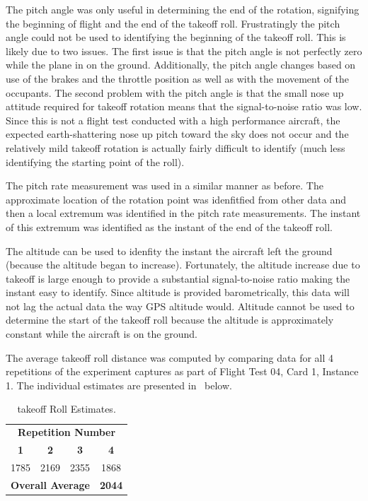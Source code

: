 \documentclass[conf]{new-aiaa}
\begin{document}
The pitch angle was only useful in determining the end of the rotation, signifying the beginning of flight and the end of the takeoff roll. Frustratingly the pitch angle could not be used to identifying the beginning of the takeoff roll. This is likely due to two issues. The first issue is that the pitch angle is not perfectly zero while the plane in on the ground. Additionally, the pitch angle changes based on use of the brakes and the throttle position as well as with the movement of the occupants. The second problem with the pitch angle is that the small nose up attitude required for takeoff rotation means that the signal-to-noise ratio was low. Since this is not a flight test conducted with a high performance aircraft, the expected earth-shattering nose up pitch toward the sky does not occur and the relatively mild takeoff rotation is actually fairly difficult to identify (much less identifying the starting point of the roll).

The pitch rate measurement was used in a similar manner as before. The approximate location of the rotation point was idenfitfied from other data and then a local extremum was identified in the pitch rate measurements. The instant of this extremum was identified as the instant of the end of the takeoff roll.

The altitude can be used to idenfity the instant the aircraft left the ground (because the altitude began to increase). Fortunately, the altitude increase due to takeoff is large enough to provide a substantial signal-to-noise ratio making the instant easy to identify. Since altitude is provided barometrically, this data will not lag the actual data the way GPS altitude would. Altitude cannot be used to determine the start of the takeoff roll because the altitude is approximately constant while the aircraft is on the ground.

The average takeoff roll distance was computed by comparing data for all 4 repetitions of the experiment captures as part of Flight Test 04, Card 1, Instance 1. The individual estimates are presented in~ below.

\begin{table}[htp!]
\centering
\caption{takeoff Roll Estimates.}
\label{takeofftable}
\begin{tabular}{ c | c | c | c }
	\multicolumn{4}{c}{\textbf{Repetition Number}}										\\
	\textbf{1} & \textbf{2} & \textbf{3} & \textbf{4}									\\
	\hline
	\SI{1785}{\foot} & \SI{2169}{\foot} & \SI{2355}{\foot} & \SI{1868}{\foot}			\\
	\hline
	\hline
	\multicolumn{3}{c}{\textbf{Overall Average}} & \textbf{\SI[detect-weight=true]{2044}{\foot}}	\\
	\hline
\end{tabular}
\end{table}
\end{document}
